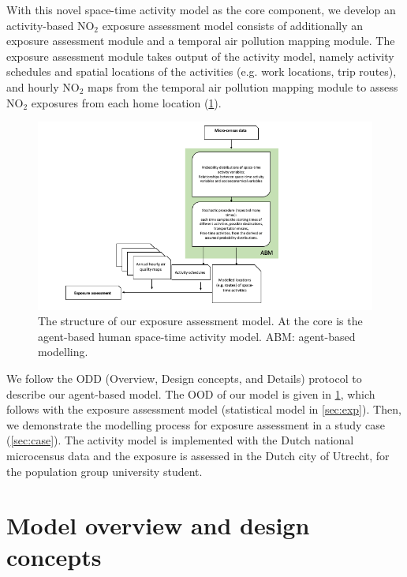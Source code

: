 \documentclass[]{article}
\begin{document}
With this novel space-time activity model as the core component, we develop an activity-based NO$_2$ exposure assessment model consists of additionally an exposure assessment module and a temporal air pollution mapping module. The exposure assessment module takes output of the activity model, namely activity schedules and spatial locations of the activities (e.g. work locations, trip routes), and hourly NO$_2$ maps from the temporal air pollution mapping module to assess NO$_2$ exposures from each home location (\cref{fig:expflow}).     

\begin{figure}
    \centering
    \includegraphics[width=\linewidth]{figure/exposureflow.png}
    \caption{The structure of our exposure assessment model. At the core is the agent-based human space-time activity model. ABM: agent-based modelling. }
    \label{fig:expflow}
\end{figure}



We follow the ODD (Overview, Design concepts, and Details) protocol \citep[][page 37,]{railsback2019agent} to describe our agent-based model. The OOD of our model is given in \cref{sec:model}, which follows with the exposure assessment model (statistical model in \cref{sec:exp}). Then, we demonstrate the modelling process for exposure assessment in a study case (\cref{sec:case}). The activity model is implemented with the Dutch national microcensus data and the exposure is assessed in the Dutch city of Utrecht, for the population group university student.  %


\section{Model overview and design concepts }
\label{sec:model}
\end{document}
